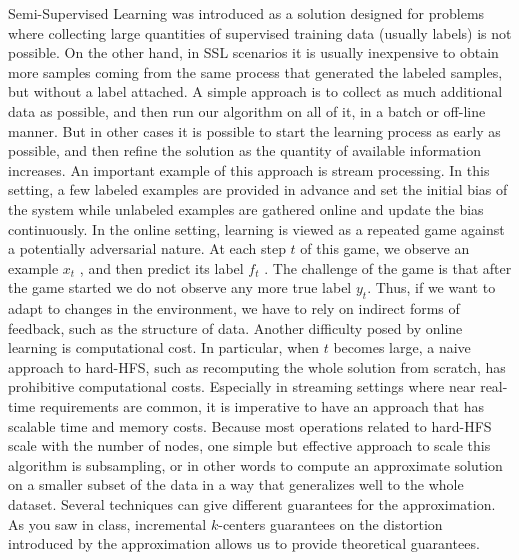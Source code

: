 \documentclass{article}
\begin{document}
Semi-Supervised Learning was introduced as a solution designed for problems
where collecting large quantities of supervised training data (usually labels) is not possible. On the other hand, in SSL scenarios it is usually inexpensive to obtain more samples coming from the same process that generated the labeled samples, but without a label attached. A simple approach is to collect as much additional data as possible, and then run our algorithm on all of it, in a batch or off-line manner. But in other cases it is possible to start the learning process as early as possible, and then refine the solution as the quantity of available information increases.
An important example of this approach is stream processing.
In this setting, a few labeled examples are provided in advance and set the initial bias of the system while unlabeled examples are gathered
online and update the bias continuously. In the online setting, learning is viewed as a repeated game against a potentially adversarial nature. At each step $t$ of this game, we observe an example $x_t$ , and then predict its
label $f_t$ . The challenge of the game is that after the
game started we do not observe any more true label $y_t$. Thus,
if we want to adapt to changes in the environment, we
have to rely on indirect forms of feedback, such as the structure of data.
Another difficulty posed by online learning is computational cost. In
particular, when $t$ becomes large, a naive approach to hard-HFS, such as
recomputing the whole solution from scratch, has prohibitive computational
costs. Especially in streaming settings where near real-time requirements
are common, it is imperative to have an approach that has scalable time and
memory costs.
Because most operations related to hard-HFS scale with the number of nodes,
one simple but effective approach to scale this algorithm is subsampling,
or in other words to compute an approximate solution on a smaller subset of the data in a way that generalizes well to the whole dataset.
Several techniques can give different guarantees for the approximation.
As you saw in class, incremental $k$-centers \cite{charikar2004incremental}
guarantees on the distortion introduced by the approximation allows us
to provide theoretical guarantees.

\end{document}
